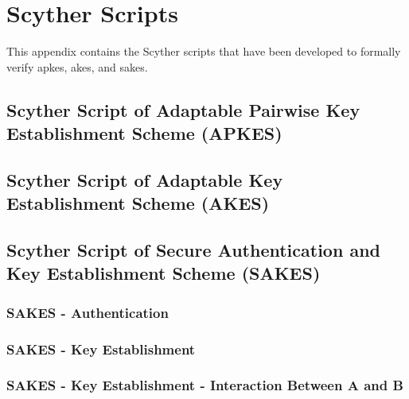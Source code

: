 \chapter{Scyther Scripts}
\label{app:listings}

This appendix contains the Scyther scripts that have been developed to formally verify \gls{apkes}, \gls{akes}, and \gls{sakes}.

\section{Scyther Script of Adaptable Pairwise Key Establishment Scheme (APKES)}
\label{app:apkes}


\section{Scyther Script of Adaptable Key Establishment Scheme (AKES)}
\label{app:akes}


\newpage

\section{Scyther Script of Secure Authentication and Key Establishment Scheme (SAKES)}
\label{app:sakes}

\subsection{SAKES - Authentication}
\label{app:sakes-auth}


\subsection{SAKES - Key Establishment}
\label{app:sakes-keys}


\subsection{SAKES - Key Establishment - Interaction Between A and B}
\label{app:sakes-keys-ab}


